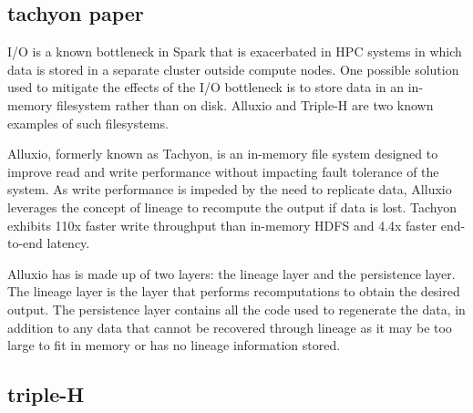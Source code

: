 \documentclass{report}
\begin{document}
    \subsection{tachyon paper} I/O is a known bottleneck in Spark that is
exacerbated in HPC systems in which data is stored in a separate cluster outside
compute nodes. One possible solution used to mitigate the effects of the I/O
bottleneck is to store data in an in-memory filesystem rather than on disk.
Alluxio and Triple-H are two known examples of such filesystems.
	
    Alluxio, formerly known as Tachyon, is an in-memory file system designed to
improve read and write performance without impacting fault tolerance of the
system. As write performance is impeded by the need to replicate data, Alluxio
leverages the concept of lineage to recompute the output if data is lost.
Tachyon exhibits 110x faster write throughput than in-memory HDFS and 4.4x
faster end-to-end latency. 

    Alluxio has is made up of two layers: the lineage layer and the persistence
layer. The lineage layer is the layer that performs recomputations to obtain the
desired output. The persistence layer contains all the code used to regenerate
the data, in addition to any data that cannot be recovered through lineage
as it may be too large to fit in memory or has no lineage information stored.
	
    \subsection{triple-H}
	
	
	
	
	
	
	
	
	
	
	
	
	
	
	
	
\end{document}
